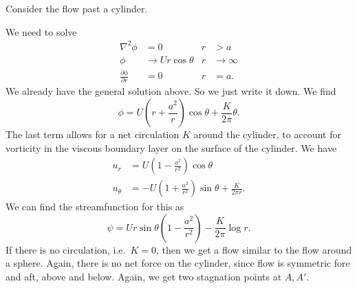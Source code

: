 \documentclass[a4paper]{article}
\begin{document}
\begin{eg}
  Consider the flow past a cylinder.
  \begin{center}
  \end{center}
  We need to solve
  \begin{align*}
    \nabla^2 \phi &= 0 & r &> a\\
    \phi &\to U r\cos \theta & r & \to \infty\\
    \frac{\partial \phi}{\partial r} &= 0 & r &= a.
  \end{align*}
  We already have the general solution above. So we just write it down. We find
  \[
    \phi = U\left(r + \frac{a^2}{r}\right) \cos \theta + \frac{K}{2\pi}\theta.
  \]
  The last term allows for a net circulation $K$ around the cylinder, to account for vorticity in the viscous boundary layer on the surface of the cylinder. We have
  \begin{align*}
    u_r &= U\left(1 - \frac{a^2}{r^2}\right) \cos \theta\\
    u_\theta &= -U \left(1 + \frac{a^2}{r^2}\right) \sin \theta + \frac{K}{2 \pi r}.
  \end{align*}
  We can find the streamfunction for this as
  \[
    \psi = Ur\sin \theta\left(1 - \frac{a^2}{r^2}\right) - \frac{K}{2\pi} \log r.
  \]
  If there is no circulation, i.e.\ $K = 0$, then we get a flow similar to the flow around a sphere. Again, there is no net force on the cylinder, since flow is symmetric fore and aft, above and below. Again, we get two stagnation points at $A, A'$.
  \begin{center}
\end{center}
\end{eg}
\end{document}
